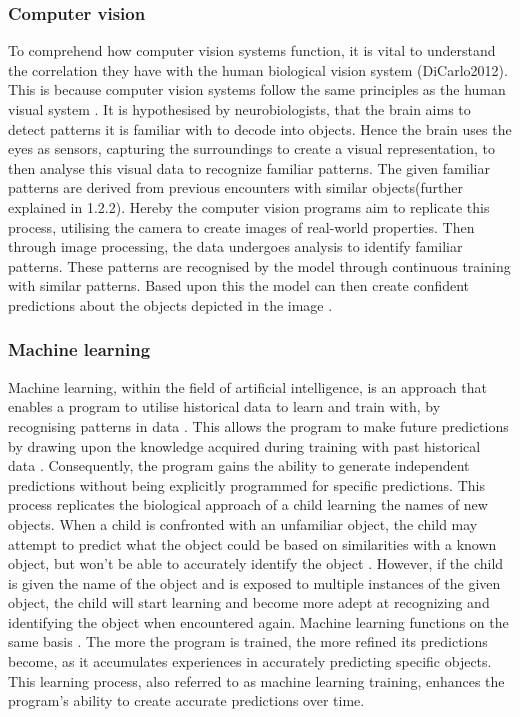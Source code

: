 \subsubsection{Computer vision}
To comprehend how computer vision systems function, it is vital to understand the correlation they have with the human biological vision system (DiCarlo2012). This is because computer vision systems follow the same principles as the human visual system \parencite[pp.~1--3]{Voulodimos2018}. It is hypothesised by neurobiologists, that the brain aims to detect patterns it is familiar with to decode into objects. Hence the brain uses the eyes as sensors, capturing the surroundings to create a visual representation, to then analyse this visual data to recognize familiar patterns. The given familiar patterns are derived from previous encounters with similar objects(further explained in 1.2.2). Hereby the computer vision programs aim to replicate this process, utilising the camera to create images of real-world properties. Then through image processing, the data undergoes analysis to identify familiar patterns. These patterns are recognised by the model through continuous training with similar patterns. Based upon this the model can then create confident predictions about the objects depicted in the image \parencite[pp.~1--7]{Jahne2000}. 

\subsubsection{Machine learning }
Machine learning, within the field of artificial intelligence, is an approach that enables a program to utilise historical data to learn and train with, by recognising patterns in data  \parencite[pp.~2--4]{Zhou2021}. This allows the program to make future predictions by drawing upon the knowledge acquired during training with past historical data \parencite[pp.~6--10]{Mitchell1983}. Consequently, the program gains the ability to generate independent predictions without being explicitly programmed for specific predictions. This process replicates the biological approach of a child learning the names of new objects. When a child is confronted with an unfamiliar object, the child may attempt to predict what the object could be based on similarities with a known object, but won't be able to accurately identify the object \parencite[pp.~6--10]{Harrington2012}. However,  if the child is given the name of the object and is exposed to multiple instances of the given object, the child will start learning and become more adept at recognizing and identifying the object when encountered again. Machine learning functions on the same basis \parencite[p.~16]{Gollapudi2016}. The more the program is trained, the more refined its predictions become, as it accumulates experiences in accurately predicting specific objects. This learning process, also referred to as machine learning training, enhances the program's ability to create accurate predictions over time. 


